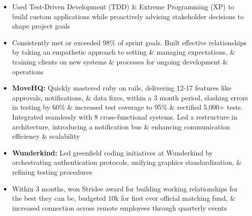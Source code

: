 \documentclass[10pt,a4paper,ragged2e]{altacv}
\begin{document}
\tagline{}


\begin{fullwidth}
\makecvheader
\end{fullwidth}



\begin{itemize}
\item {Used Test-Driven Development (TDD) \& Extreme Programming (XP) to build custom applications while proactively advising stakeholder decisions to shape project goals}
\item {Consistently met or exceeded 98\% of sprint goals. Built effective relationships by taking an empathetic approach to setting \& managing expectations, \& training clients on new systems \& processes for ongoing development \& operations}
\item {\textbf{MoveHQ:} Quickly mastered ruby on rails, delivering 12-17 features like approvals, notifications, \& data fixes, within a 3 month period, slashing errors in testing by 60\% \& increased test coverage to 95\% \& rectified 5,000+ tests. Integrated seamlessly with 8 cross-functional systems. Led a restructure in architecture, introducing a notification bus \& enhancing communication efficiency \& scalability}
\item {\textbf{Wunderkind:} Led greenfield coding initiatives at Wunderkind by orchestrating authentication protocols, unifying graphics standardization, \& refining testing procedures}

\item{Within 3 months, won Stridee award for building working relationships for the best they can be, budgeted 10k for first ever official matching fund, \& increased connection across remote employees through quarterly events}
\end{itemize}
\end{document}
